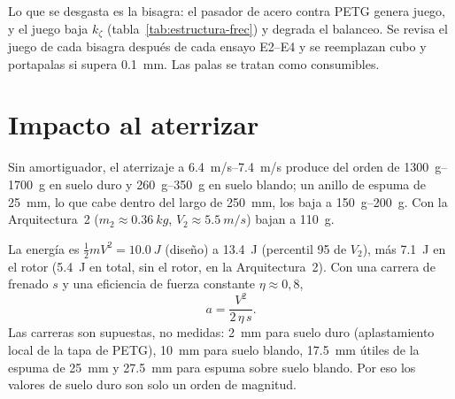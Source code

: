 \begin{nota}
Lo que se desgasta es la bisagra: el pasador de acero contra PETG genera juego, y el
juego baja $k_\zeta$ (tabla~\ref{tab:estructura-frec}) y degrada el balanceo. Se revisa el
juego de cada bisagra después de cada ensayo E2--E4 y se reemplazan cubo y portapalas si
supera \SI{0.1}{mm}. Las palas se tratan como consumibles.
\end{nota}

\section{Impacto al aterrizar}\label{sec:estructura-impacto}

Sin amortiguador, el aterrizaje a \SIrange{6.4}{7.4}{m/s} produce del orden de
\SIrange{1300}{1700}{g} en suelo duro y \SIrange{260}{350}{g} en suelo blando; un anillo
de espuma de \SI{25}{mm}, lo que cabe dentro del largo de \SI{250}{mm}, los baja a
\SIrange{150}{200}{g}. Con la Arquitectura~2 ($m_2\approx\SI{0.36}{kg}$, $V_2\approx\SI{5.5}{m/s}$) bajan a
\SI{110}{g}.

La energía es $\frac12mV^2=\SI{10.0}{J}$ (diseño) a \SI{13.4}{J} (percentil 95 de $V_2$),
más \SI{7.1}{J} en el rotor (\SI{5.4}{J} en total, sin el rotor, en la Arquitectura~2). Con una
carrera de frenado $s$ y una eficiencia de fuerza constante $\eta\approx0{,}8$,
\begin{equation}
  a=\frac{V^2}{2\,\eta\,s}.
  \label{eq:estructura-impacto}
\end{equation}
Las carreras son supuestas, no medidas: \SI{2}{mm} para suelo duro (aplastamiento local de
la tapa de PETG), \SI{10}{mm} para suelo blando, \SI{17.5}{mm} útiles de la espuma de
\SI{25}{mm} y \SI{27.5}{mm} para espuma sobre suelo blando. Por eso los valores de suelo
duro son solo un orden de magnitud.

